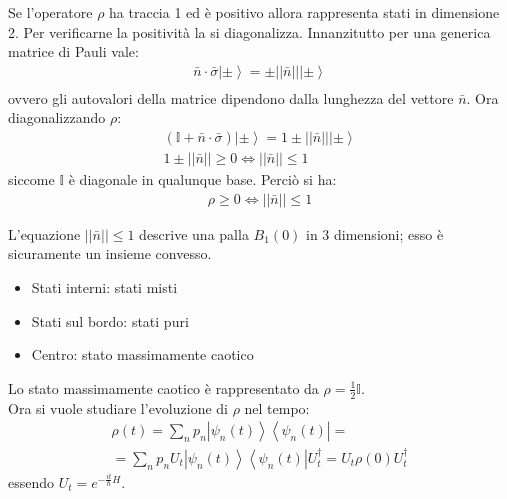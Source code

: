 Se l'operatore $\rho$ ha traccia 1 ed è positivo allora rappresenta stati in dimensione 2. Per verificarne la positività la si diagonalizza.
Innanzitutto per una generica matrice di Pauli vale:
\begin{equation}\begin{split}
\bar n\cdot \bar \sigma\left |\pm \right\rangle=\pm ||\bar n||\left |\pm \right\rangle \\
\end{split}\end{equation}
ovvero gli autovalori della matrice dipendono dalla lunghezza del vettore $\bar n$.
Ora diagonalizzando $\rho$:
\begin{equation}\begin{split}
\left(\mathbb{I}+\bar n\cdot \bar \sigma\right)\left |\pm \right\rangle=1\pm ||\bar n|| \left|\pm \right\rangle \\
1\pm ||\bar n|| \ge 0 \Longleftrightarrow ||\bar n||\le 1 
\end{split}\end{equation} 
siccome $\mathbb{I}$ è diagonale in qualunque base. Perciò si ha:
\begin{equation}\begin{split}
\rho\ge 0 \Longleftrightarrow ||\bar n||\le 1
\end{split}\end{equation}

L'equazione $|| \bar n|| \le 1$ descrive una palla $B_1 \left(0\right)$ in 3 dimensioni; esso è sicuramente un insieme convesso.
\begin{itemize}
\item Stati interni: stati misti
\item Stati sul bordo: stati puri
\item Centro: stato massimamente caotico
\end{itemize}
Lo stato massimamente caotico è rappresentato da $\rho=\frac{1}{2}\mathbb{I}$.\\

Ora si vuole studiare l'evoluzione di $\rho$ nel tempo:
\begin{equation}\begin{split}
\rho\left(t\right)=\sum_n{p_n\left |\psi _n\left(t\right) \right\rangle\left\langle \psi _n\left(t\right)\right |}=\\
=\sum_n{p_nU_t\left |\psi _n (t) \right\rangle\left\langle \psi _n (t)\right |U_t^{\dag}}=U_t\rho(0)U_t^{\dag}
\end{split}\end{equation}
essendo $U_t=e^{-\frac{it}{\hbar }H}$.\\


